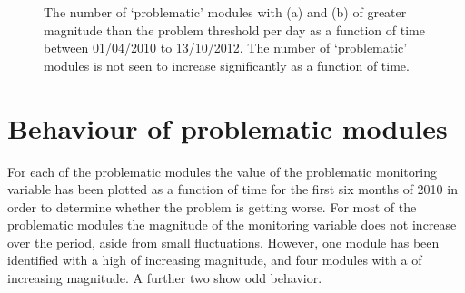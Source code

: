 \begin{figure}
	\centering
	\caption{The number of `problematic' modules with (a) \deltat and (b)
        \tdiff of greater magnitude than the problem threshold per day as a
        function of time between 01/04/2010 to 13/10/2012. The number of
        `problematic' modules is not seen to increase significantly as a
        function of time.}
	\label{fig:num_pm}
\end{figure}

\section{Behaviour of problematic modules}

For each of the problematic modules the value of the problematic monitoring variable has been plotted as a function of time for the first six months of 2010 in order to determine whether the problem is getting worse. For most of the problematic modules the magnitude of the monitoring variable does not increase over the period, aside from small fluctuations.  However, one module has been identified with a high \deltat of increasing magnitude, and four modules with a \tdiff of increasing magnitude. A further two show odd behavior. 

